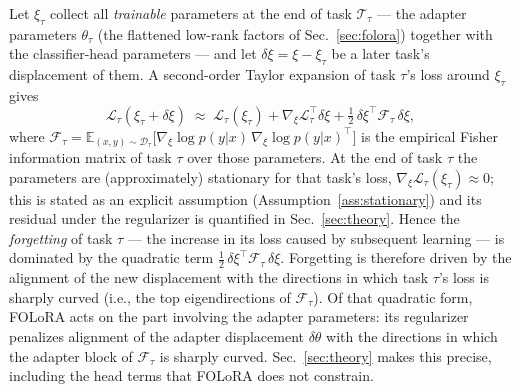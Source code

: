 Let $\xi_\tau$ collect all \emph{trainable} parameters at the end of task
$\mathcal{T}_\tau$ --- the adapter parameters $\theta_\tau$ (the flattened low-rank factors
of Sec.~\ref{sec:folora}) together with the classifier-head parameters --- and let
$\delta\xi=\xi-\xi_\tau$ be a later task's displacement of them. A second-order Taylor
expansion of task $\tau$'s loss around $\xi_\tau$ gives
\begin{equation}
\mathcal{L}_\tau(\xi_\tau+\delta\xi)
\;\approx\; \mathcal{L}_\tau(\xi_\tau)
+ \nabla_\xi\mathcal{L}_\tau^{\!\top}\delta\xi
+ \tfrac12\, \delta\xi^{\!\top} \mathcal{F}_\tau\, \delta\xi,
\label{eq:taylor}
\end{equation}
where $\mathcal{F}_\tau=\mathbb{E}_{(x,y)\sim\mathcal{D}_\tau}\big[\nabla_\xi \log p(y|x)\,\nabla_\xi\log p(y|x)^{\!\top}\big]$
is the empirical Fisher information matrix of task $\tau$ over those parameters.
At the end of task $\tau$ the parameters are (approximately) stationary for that task's
loss, $\nabla_\xi\mathcal{L}_\tau(\xi_\tau)\approx 0$; this is stated as an explicit
assumption (Assumption~\ref{ass:stationary}) and its residual under the regularizer is
quantified in Sec.~\ref{sec:theory}. Hence the \emph{forgetting} of task $\tau$
--- the increase in its loss caused by subsequent learning --- is dominated by the
quadratic term $\frac12\,\delta\xi^{\!\top}\mathcal{F}_\tau\,\delta\xi$. Forgetting is
therefore driven by the alignment of the new displacement with the directions in
which task $\tau$'s loss is sharply curved (i.e., the top eigendirections of
$\mathcal{F}_\tau$). Of that quadratic form, FOLoRA acts on the part involving the adapter
parameters: its regularizer penalizes alignment of the adapter displacement $\delta\theta$
with the directions in which the adapter block of $\mathcal{F}_\tau$ is sharply curved.
Sec.~\ref{sec:theory} makes this precise, including the head terms that FOLoRA does not
constrain.

